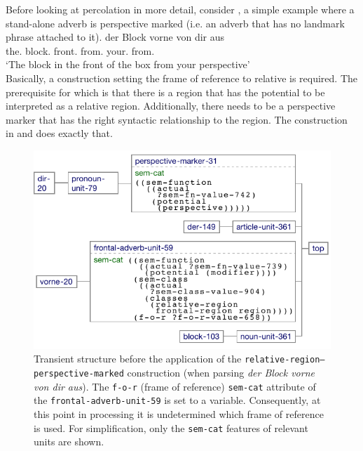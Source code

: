 Before looking at percolation in more detail, consider , a simple example where a 
stand-alone adverb is perspective marked (i.e. an adverb that has no landmark 
phrase attached to it).
\ea
\label{e:der-block-vorne-von-dir-aus}
\gll der Block vorne von dir aus\\
the.{\NOM} block.{\NOM} front.{\ADV}  from.{\PREP} your.{\DAT} from.{\PREP}\\ 
\glt `The block in the front of the box from your perspective'\\
\z
Basically, a construction setting the frame of reference to relative is required.
The prerequisite for which is that there is a region that has the potential to be
interpreted as a relative region. Additionally, there needs to be a perspective 
marker that has the right syntactic relationship to the region.
The construction in  and  does exactly that.

\begin{figure}
\begin{center}
\includegraphics[width=0.8\columnwidth]{figs/perspective-marking-parsing-vorn-von-dir-aus-before} 
\caption[Transient structure before application]{%
Transient structure before the application of 
the {\footnotesize\tt relative-region--perspective-marked} construction
(when parsing \textit{der Block vorne von dir aus}). The {\footnotesize\tt f-o-r} 
(frame of reference) {\footnotesize\tt sem-cat} attribute of the 
{\footnotesize\tt frontal-adverb-unit-59} is set to a variable. Consequently, 
at this point in processing it is undetermined which
frame of reference is used. For simplification, 
only the {\footnotesize\tt sem-cat} features of relevant units 
are shown.}
\label{f:setting-f-o-r-before}
\end{center}
\end{figure}

